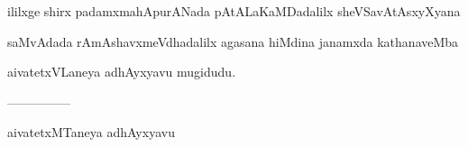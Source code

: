 \documentclass{article}
\begin{document}
\begin{center}
ililxge shirx padamxmahApurANada pAtALaKaMDadalilx sheVSavAtAsxyXyana
\end{center}

\begin{center}
saMvAdada rAmAshavxmeVdhadalilx agasana hiMdina janamxda kathanaveMba
\end{center}

\begin{center}
aivatetxVLaneya adhAyxyavu mugidudu.
\end{center}

\begin{center}
---------------
\end{center}

\begin{center}
aivatetxMTaneya adhAyxyavu
\end{center}
\end{document}
